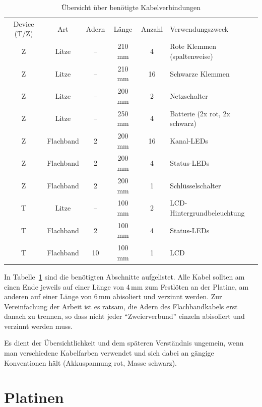 \documentclass[pdftex, parskip, numbers=noenddot, toc=listof]{scrbook}
\begin{document}
			\begin{table}
				\centering
				\begin{tabularx}{\textwidth}{cccccX}
					\hline\hline
					Device (T/Z) & Art       & Adern & Länge & Anzahl & Verwendungszweck              \\
					Z            & Litze     & --    & 210 mm & 4      & Rote Klemmen (spaltenweise)   \\
					Z            & Litze     & --    & 210 mm & 16     & Schwarze Klemmen              \\
					Z            & Litze     & --    & 200 mm & 2      & Netzschalter                  \\
					Z            & Litze     & --    & 250 mm & 4      & Batterie (2x rot, 2x schwarz) \\
					Z            & Flachband & 2     & 200 mm & 16     & Kanal-LEDs                    \\
					Z            & Flachband & 2     & 200 mm & 4      & Status-LEDs                   \\
					Z            & Flachband & 2     & 200 mm & 1      & Schlüsselschalter            \\ \hline
					T            & Litze     & --    & 100 mm & 2      & LCD-Hintergrundbeleuchtung    \\
					T            & Flachband & 2     & 100 mm & 4      & Status-LEDs                   \\
					T            & Flachband & 10    & 100 mm & 1      & LCD                           \\ \hline\hline
				\end{tabularx}
				\caption{Übersicht über benötigte Kabelverbindungen}
				\label{tab:kabel}
			\end{table}

			In Tabelle~\ref{tab:kabel} sind die benötigten Abschnitte aufgelistet. Alle Kabel sollten am einen Ende jeweils auf einer Länge von 4\,mm zum Festlöten an der Platine, am anderen auf einer Länge von 6\,mm abisoliert und verzinnt werden. Zur Vereinfachung der Arbeit ist es ratsam, die Adern des Flachbandkabels erst danach zu trennen, so dass nicht jeder \enquote{Zweierverbund} einzeln abisoliert und verzinnt werden muss.

			Es dient der Übersichtlichkeit und dem späteren Verständnis ungemein, wenn man verschiedene Kabelfarben verwendet und sich dabei an gängige Konventionen hält (Akkuspannung rot, Masse schwarz).

		\section{Platinen}
\end{document}
